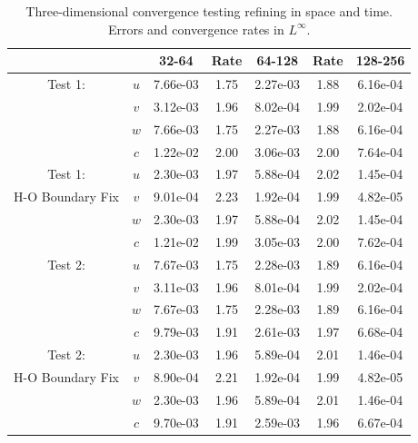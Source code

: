 \documentclass[final]{siamltex}
\begin{document}
\begin{table}[h]
\begin{center}
\caption{Three-dimensional convergence testing refining in space and time.
Errors and convergence rates in $L^\infty$.}
\label{tab:Linf_3d}
\begin{tabular}{ccccccc}
& & 32-64 & Rate & 64-128 & Rate & 128-256 \\
\hline
Test 1:             & $u$ & 7.66e-03 & 1.75 & 2.27e-03 & 1.88 & 6.16e-04 \\
                    & $v$ & 3.12e-03 & 1.96 & 8.02e-04 & 1.99 & 2.02e-04 \\
                    & $w$ & 7.66e-03 & 1.75 & 2.27e-03 & 1.88 & 6.16e-04 \\
                    & $c$ & 1.22e-02 & 2.00 & 3.06e-03 & 2.00 & 7.64e-04 \\
\hline
Test 1:             & $u$ & 2.30e-03 & 1.97 & 5.88e-04 & 2.02 & 1.45e-04 \\
H-O Boundary Fix    & $v$ & 9.01e-04 & 2.23 & 1.92e-04 & 1.99 & 4.82e-05 \\
                    & $w$ & 2.30e-03 & 1.97 & 5.88e-04 & 2.02 & 1.45e-04 \\
                    & $c$ & 1.21e-02 & 1.99 & 3.05e-03 & 2.00 & 7.62e-04 \\
\hline
Test 2:             & $u$ & 7.67e-03 & 1.75 & 2.28e-03 & 1.89 & 6.16e-04 \\
                    & $v$ & 3.11e-03 & 1.96 & 8.01e-04 & 1.99 & 2.02e-04 \\
                    & $w$ & 7.67e-03 & 1.75 & 2.28e-03 & 1.89 & 6.16e-04 \\
                    & $c$ & 9.79e-03 & 1.91 & 2.61e-03 & 1.97 & 6.68e-04 \\
\hline
Test 2:             & $u$ & 2.30e-03 & 1.96 & 5.89e-04 & 2.01 & 1.46e-04 \\
H-O Boundary Fix    & $v$ & 8.90e-04 & 2.21 & 1.92e-04 & 1.99 & 4.82e-05 \\
                    & $w$ & 2.30e-03 & 1.96 & 5.89e-04 & 2.01 & 1.46e-04 \\
                    & $c$ & 9.70e-03 & 1.91 & 2.59e-03 & 1.96 & 6.67e-04
\end{tabular}
\end{center}
\end{table}
\end{document}
